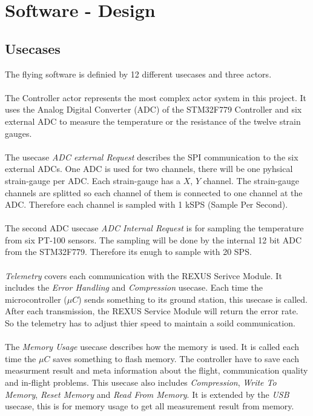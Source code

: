 \chapter{Software - Design}
\section{Usecases}
The flying software is definied by 12 different usecases and three actors. \\ \\
The Controller actor represents the most complex actor system in this project. It uses the Analog Digital Converter (ADC) of the STM32F779 Controller and six external ADC to measure the temperature or the resistance of the twelve strain gauges. \\ \\ 
The usecase \textit{ADC external Request} describes the SPI communication to the six external ADCs. One ADC is used for two channels, there will be one pyhsical strain-gauge per ADC. Each strain-gauge has a $X$, $Y$ channel. The strain-gauge channels are splitted so each channel of them is connected to one channel at the ADC. Therefore each channel is sampled with  1 kSPS (Sample Per Second). \\ \\
The second ADC usecase \textit{ADC Internal Request} is for sampling the temperature from six PT-100 sensors. The sampling will be done by the internal 12 bit ADC from the STM32F779. Therefore its enugh to sample with 20 SPS. \\ \\
\textit{Telemetry} covers each communication with the REXUS Serivce Module. It includes the \textit{Error Handling} and \textit{Compression} usecase. Each time the microcontroller ($\mu C$) sends something to its ground station, this usecase is called. After each transmission, the REXUS Service Module will return the error rate. So the telemetry has to adjust thier speed to maintain a soild communication. \\ \\
The \textit{Memory Usage} usecase describes how the memory is used. It is called each time the $\mu C$ saves something to flash memory. The controller have to save each measurment result and meta information about the flight, communication quality and in-flight problems. This usecase also includes \textit{Compression}, \textit{Write To Memory}, \textit{Reset Memory} and \textit{Read From Memory}. It is extended by the \textit{USB} usecase, this is for memory usage to get all  measurement result from memory. \\ \\ 

